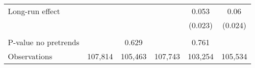 {\begin{tabular}{l*{5}{c}}
Long-run effect&                  &                  &                  &0.053\sym{**}         &0.06\sym{**}         \\
          &                  &                  &                  &  (0.023)         &  (0.024)         \\
\hline    &                  &                  &                  &                  &                  \\
P-value no pretrends&                  &    0.629         &                  &    0.761         &                  \\
Observations&  107,814         &  105,463         &  107,743         &  103,254         &  105,534         \\
\hline\hline
\end{tabular}
}
